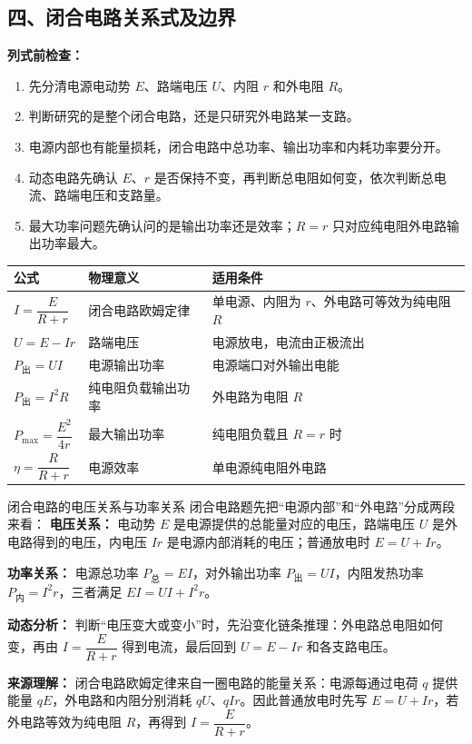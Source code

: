 \begin{samepage}
\section*{四、闭合电路关系式及边界}

\textbf{列式前检查：}
\nopagebreak[4]
\begin{enumerate}
  \item 先分清电源电动势 $E$、路端电压 $U$、内阻 $r$ 和外电阻 $R$。
  \item 判断研究的是整个闭合电路，还是只研究外电路某一支路。
  \item 电源内部也有能量损耗，闭合电路中总功率、输出功率和内耗功率要分开。
  \item 动态电路先确认 $E$、$r$ 是否保持不变，再判断总电阻如何变，依次判断总电流、路端电压和支路量。
  \item 最大功率问题先确认问的是输出功率还是效率；$R=r$ 只对应纯电阻外电路输出功率最大。
\end{enumerate}
\end{samepage}

\begin{center}
\begin{tabular}{lll}
\toprule
公式 & 物理意义 & 适用条件 \\
\midrule
$I = \dfrac{E}{R+r}$ & 闭合电路欧姆定律 & 单电源、内阻为 $r$、外电路可等效为纯电阻 $R$ \\
$U = E - Ir$ & 路端电压 & 电源放电，电流由正极流出 \\
$P_{\text{出}} = UI$ & 电源输出功率 & 电源端口对外输出电能 \\
$P_{\text{出}} = I^2R$ & 纯电阻负载输出功率 & 外电路为电阻 $R$ \\
$P_{\max} = \dfrac{E^2}{4r}$ & 最大输出功率 & 纯电阻负载且 $R = r$ 时 \\
$\eta = \dfrac{R}{R+r}$ & 电源效率 & 单电源纯电阻外电路 \\
\bottomrule
\end{tabular}
\end{center}

\begin{learningbox}{闭合电路的电压关系与功率关系}
闭合电路题先把“电源内部”和“外电路”分成两段来看：
\textbf{电压关系：} 电动势 $E$ 是电源提供的总能量对应的电压，路端电压 $U$ 是外电路得到的电压，内电压 $Ir$ 是电源内部消耗的电压；普通放电时 $E=U+Ir$。

\textbf{功率关系：} 电源总功率 $P_{\text{总}}=EI$，对外输出功率 $P_{\text{出}}=UI$，内阻发热功率 $P_{\text{内}}=I^2r$，三者满足 $EI=UI+I^2r$。

\textbf{动态分析：} 判断“电压变大或变小”时，先沿变化链条推理：外电路总电阻如何变，再由 $I=\dfrac{E}{R+r}$ 得到电流，最后回到 $U=E-Ir$ 和各支路电压。

\textbf{来源理解：} 闭合电路欧姆定律来自一圈电路的能量关系：电源每通过电荷 $q$ 提供能量 $qE$，外电路和内阻分别消耗 $qU$、$qIr$。因此普通放电时先写 $E=U+Ir$，若外电路等效为纯电阻 $R$，再得到 $I=\dfrac{E}{R+r}$。
\end{learningbox}

